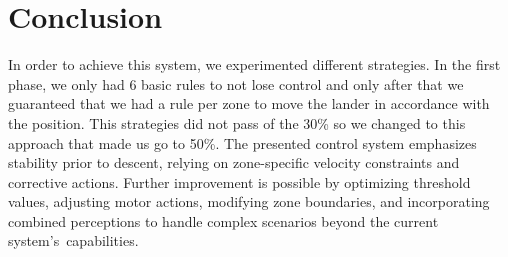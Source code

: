\documentclass{article}
\begin{document}
\section{Conclusion}
In order to achieve this system, we experimented different strategies. In the first phase, we only had 6 basic rules to not lose control and only after that we guaranteed that we had a rule per zone to move the lander in accordance with the position. This strategies did not pass of the 30\% so we changed to this approach that made us go to 50\%.
The presented control system emphasizes stability prior to descent, relying on zone-specific velocity constraints and corrective actions. Further improvement is possible by optimizing threshold values, adjusting motor actions, modifying zone boundaries, and incorporating combined perceptions to handle complex scenarios beyond the current system's capabilities.
\end{document}
